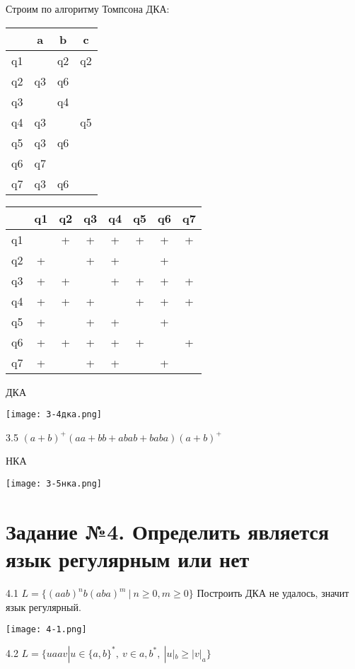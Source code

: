\documentclass{article}
\begin{document}
Строим по алгоритму Томпсона ДКА:

\begin{tabular}{ | c | c | c | c | }
\hline
& a & b & c \\ \hline
q1 & & q2 & q2 \\ \hline
q2 & q3 & q6 & \\ \hline
q3 & & q4 & \\ \hline
q4 & q3 & & q5\\ \hline
q5 & q3 & q6 & \\ \hline
q6 & q7 & & \\ \hline
q7 & q3 & q6 & \\ \hline
\end{tabular}

\begin{tabular}{ | c | c | c | c | c | c | c | c | }
\hline
& q1 & q2 & q3 & q4 & q5 & q6 & q7 \\ \hline
q1 & & + & + & + & + & + & + \\ \hline
q2 & + & & + & + & & + & \\ \hline
q3 & + & + & & + & + & + & + \\ \hline
q4 & + & + & + & & + & + & + \\ \hline
q5 & + & & + & + & & + & \\ \hline
q6 & + & + & + & + & + & & + \\ \hline
q7 & + & & + & + & & + & \\ \hline
\end{tabular}

ДКА

\texttt{[image: 3-4дка.png]}

\newpage

3.5 \((a + b)^+(aa + bb + abab + baba)(a + b)^+\)

НКА

\texttt{[image: 3-5нка.png]}

\newpage
\section
{Задание №4. Определить является язык регулярным или нет}

4.1 \(L = \{(aab)^nb(aba)^m \ |\ n \geq 0, m \geq 0\}\)
Построить ДКА не удалось, значит язык регулярный.

\texttt{[image: 4-1.png]}

4.2 \(L = \{uaav | u \in \{a, b\}^*, \ v \in a, b^*, \ |u|_b \geq |v|_a\}\)
\end{document}

